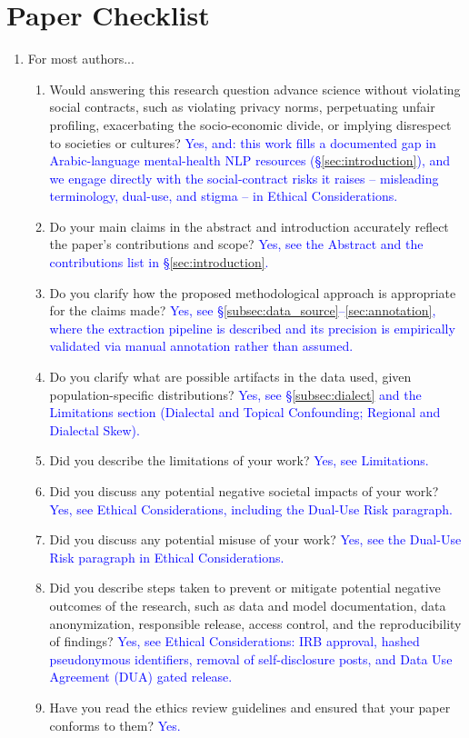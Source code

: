 \documentclass[letterpaper]{article} %
\newcommand{\answerYes}[1]{\textcolor{blue}{#1}}
\begin{document}


\section{Paper Checklist}
\label{sec:checklist}

\begin{enumerate}

\item For most authors...
\begin{enumerate}
    \item  Would answering this research question advance science without violating social contracts, such as violating privacy norms, perpetuating unfair profiling, exacerbating the socio-economic divide, or implying disrespect to societies or cultures?
    \answerYes{Yes, and: this work fills a documented gap in Arabic-language mental-health NLP resources (\S\ref{sec:introduction}), and we engage directly with the social-contract risks it raises -- misleading terminology, dual-use, and stigma -- in Ethical Considerations.}
  \item Do your main claims in the abstract and introduction accurately reflect the paper's contributions and scope?
    \answerYes{Yes, see the Abstract and the contributions list in \S\ref{sec:introduction}.}
   \item Do you clarify how the proposed methodological approach is appropriate for the claims made?
    \answerYes{Yes, see \S\ref{subsec:data_source}--\ref{sec:annotation}, where the extraction pipeline is described and its precision is empirically validated via manual annotation rather than assumed.}
   \item Do you clarify what are possible artifacts in the data used, given population-specific distributions?
    \answerYes{Yes, see \S\ref{subsec:dialect} and the Limitations section (Dialectal and Topical Confounding; Regional and Dialectal Skew).}
  \item Did you describe the limitations of your work?
    \answerYes{Yes, see Limitations.}
  \item Did you discuss any potential negative societal impacts of your work?
    \answerYes{Yes, see Ethical Considerations, including the Dual-Use Risk paragraph.}
      \item Did you discuss any potential misuse of your work?
    \answerYes{Yes, see the Dual-Use Risk paragraph in Ethical Considerations.}
    \item Did you describe steps taken to prevent or mitigate potential negative outcomes of the research, such as data and model documentation, data anonymization, responsible release, access control, and the reproducibility of findings?
    \answerYes{Yes, see Ethical Considerations: IRB approval, hashed pseudonymous identifiers, removal of self-disclosure posts, and Data Use Agreement (DUA) gated release.}
  \item Have you read the ethics review guidelines and ensured that your paper conforms to them?
    \answerYes{Yes.}
\end{enumerate}


\end{enumerate}
\end{document}
